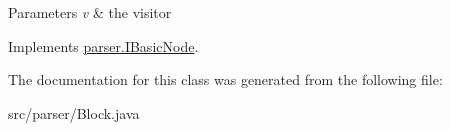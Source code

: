 \begin{DoxyParams}{Parameters}
{\em v} & the visitor \\
\hline
\end{DoxyParams}


Implements \hyperlink{interfaceparser_1_1_i_basic_node_af8790b7076c59e00781ba3d4118757cd}{parser.\+I\+Basic\+Node}.



The documentation for this class was generated from the following file\+:\begin{DoxyCompactItemize}
\item 
src/parser/Block.\+java\end{DoxyCompactItemize}
